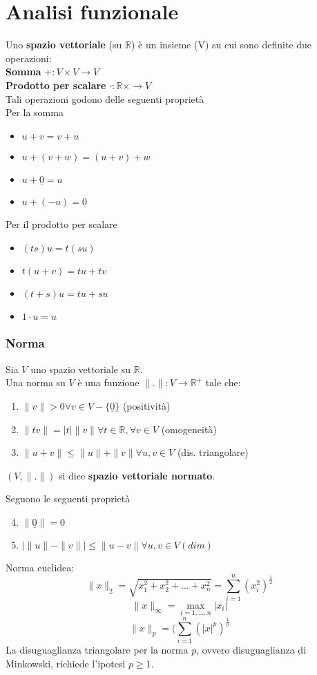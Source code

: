 \documentclass[a4paper]{article}
\newcommand{\R}{\mathbb{R}}
\begin{document}
\section{Analisi funzionale}
Uno \textbf{spazio vettoriale} (su $\R$) è un insieme (V) su cui sono definite due operazioni:
\\\textbf{Somma} $+:V \times V\to V$
\\\textbf{Prodotto per scalare} $\cdot :\R \times \to V$
\\Tali operazioni godono delle seguenti proprietà
\\Per la somma
\begin{itemize}
	\item $u+v=v+u$ 
	\item $u+(v+w)=(u+v)+w$
	\item $u+\underline 0=u$
	\item $u+(-u)=\underline 0$
\end{itemize}
Per il prodotto per scalare
\begin{itemize}
	\item $(ts)u=t(su)$
	\item $t(u+v)=tu+tv$
	\item $(t+s)u=tu+su$
	\item $1\cdot u=u$
\end{itemize}
\subsubsection{Norma}
\begin{tcolorbox}
	Sia $V$ uno spazio vettoriale su $\R$.
	\\Una norma su $V$ è una funzione $\|.\|:V\to \R^+$ tale che:
	\begin{enumerate}
		\item $\|v\|>0\forall v\in V-\{\underline 0\} $ (positività)
		\item $\|tv\|=|t|\|v\|\forall t\in\R,\forall v\in V$ (omogeneità)
		\item $\|u+v\|\le \|u\|+\|v\|\forall u,v\in V$ (dis. triangolare)
	\end{enumerate}
\end{tcolorbox}
\begin{tcolorbox}
	$(V,\|.\|)$ si dice \textbf{spazio vettoriale normato}.
\end{tcolorbox}
Seguono le seguenti proprietà
\begin{enumerate}
	\setcounter{enumi}{3}
	\item $\|\underline 0\|=0$
	\item $| \|u\|-\|v\| |\le \|u-v\|\forall u,v\in V (dim)$
\end{enumerate}
Norma euclidea:
\[\|x\|_2=\sqrt{x_1^2+x_2^2+\ldots+x_n^2} =\sum_{i=1}^{n} (x_i^2)^\frac{1}{2}\]
\[\|x\|_\infty=\max_{i=1,\ldots,n}|x_i|\]
\[\|x\|_p=(\sum_{i=1}^{n}(|x|^p)^{\frac{1}{p}}\]
La disuguaglianza triangolare per la norma $p$, ovvero disuguaglianza di Minkowski, richiede l'ipotesi $p\ge 1$.
\end{document}
